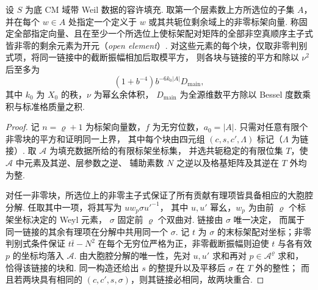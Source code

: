 \begin{lemma}[开元上的同链接平方和]
\label{lem:b-open-link}
\emitthmsource
设 $S$ 为底 CM 域带 Weil 数据的容许填充.
取第一个层素数上方所选位的子集 $A$，并在每个 $w\in A$ 处指定一个定义于 $w$ 或其共轭位剩余域上的非零标架向量.
称固定全部指定向量、且在至少一个所选位上使标架配对矩阵的全部非空真顺序主子式皆非零的剩余元素为开元（\emph{open element}）.
对这些元素的每个块，仅取非零判别式项，将同一链接中的截断振幅相加后取模平方，
则各块与链接的平方和除以 $\nu^2$ 后至多为
\[
 (1+b^{-4})b^{-6k_0|A|}D_{\mathrm{main}},
\]
其中 $k_0$ 为 $X_0$ 的秩，$\nu$ 为幂幺余体积，
$D_{\mathrm{main}}$ 为全源维数平方除以 Bessel 度数乘积与标准格质量之积.
\end{lemma}
\begin{proof}
记 $n=\varrho+1$ 为标架向量数，$f$ 为无穷位数，$a_0=|A|$.
只需对任意有限个非零块的平方和证明同一上界，
其中每个块由四元组 $(c,s,c',\Lambda)$ 标记（$\Lambda$ 为链接）.
取 $\mathcal A$ 为填充数据所给的有限标架坐标集，
并选共轭稳定的有限位集 $T$，使 $\mathcal A$ 中元素及其逆、层参数之逆、
辅助素数 $N$ 之逆以及格基矩阵及其逆在 $T$ 外均为整.

对任一非零块，所选位上的非零主子式保证了所有贡献有理项皆具备相应的大胞腔分解.
任取其中一项，将其写为 $u w_p\sigma u'^{-1}$，
其中 $u,u'$ 幂幺，$w_p$ 为由前 $\varrho$ 个标架坐标决定的 Weyl 元素，
$\sigma$ 固定前 $\varrho$ 个双曲对. 链接由 $\sigma$ 唯一决定，
而属于同一链接的其余有理项在分解中共用同一个 $\sigma$.
记 $t$ 为 $\sigma$ 的末标架配对坐标；非零判别式条件保证 $t\bar t-N^2$
在每个无穷位严格为正，非零截断振幅则迫使 $t$ 与各有效 $p$ 的坐标均落入
$\mathcal A$. 由大胞腔分解的唯一性，先对 $u,u'$ 求和再对 $p\in\mathcal A^{\varrho}$ 求和，
恰得该链接的块和.
同一构造还给出 $s$ 的整提升以及平移后 $\sigma$ 在 $T$ 外的整性；
而且若两块具有相同的 $(c,c',s,\sigma)$，则其链接必相同，故两块重合.


\end{proof}
